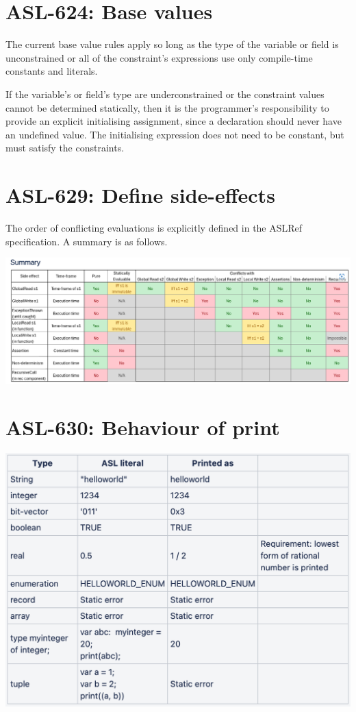 \section{ASL-624: Base values}

The current base value rules apply so long as the type of the variable or
field is unconstrained or all of the constraint's expressions use only
compile-time constants and literals.

If the variable's or field's type are underconstrained or the constraint
values cannot be determined statically, then it is the programmer's
responsibility to provide an explicit initialising assignment, since a
declaration should never have an undefined value. The initialising
expression does not need to be constant, but must satisfy the
constraints.

\section{ASL-629: Define side-effects}

The order of conflicting evaluations is explicitly defined in the ASLRef
specification. A summary is as follows.

\includegraphics[width=\textwidth]{sideeffects.png}

\section{ASL-630: Behaviour of print}

\includegraphics[width=\textwidth]{print.png}

